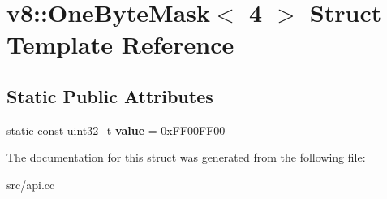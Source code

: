 \hypertarget{structv8_1_1_one_byte_mask_3_014_01_4}{}\section{v8\+:\+:One\+Byte\+Mask$<$ 4 $>$ Struct Template Reference}
\label{structv8_1_1_one_byte_mask_3_014_01_4}
\subsection*{Static Public Attributes}
\begin{DoxyCompactItemize}
\item 
\hypertarget{structv8_1_1_one_byte_mask_3_014_01_4_af50f63869f0617580be0e3fbb80ea583}{}static const uint32\+\_\+t {\bfseries value} = 0x\+F\+F00\+F\+F00\label{structv8_1_1_one_byte_mask_3_014_01_4_af50f63869f0617580be0e3fbb80ea583}

\end{DoxyCompactItemize}


The documentation for this struct was generated from the following file\+:\begin{DoxyCompactItemize}
\item 
src/api.\+cc\end{DoxyCompactItemize}
